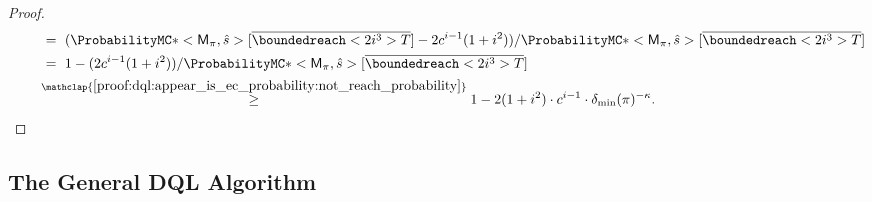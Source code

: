 \documentclass{theoretics}
\newcommand{\unionSym}{\cup}
\newcommand{\unionBin}{\mathbin{\unionSym}}
\newcommand{\union}{\unionBin}
\DeclareMathOperator*{\argmax}{arg\,max}
\newcommand{\MC}{\mathsf{M}}
\newcommand{\States}{S}
\newcommand{\initialstate}{\hat{s}}
\newcommand{\strategy}{\pi}
\DeclareMathOperator{\val}{\mathcal{V}}
\newcommand{\upperbound}{\mathsf{Up}}
\newcommand{\lowerbound}{\mathsf{Lo}}
\newcommand{\targetset}{T}
\newcommand{\successor}{\mathsf{succ}}
\newcommand{\algostep}{\mathsf{t}}
\newcommand{\algoepisode}{\mathsf{e}}
\newcommand{\umaxactions}{\mathsf{MaxA}}
\begin{document}
\begin{proof}
\begin{align*}
		& \qquad ~=~ (\ProbabilityMC*<\MC_\strategy, \initialstate>[\overline{\boundedreach<2 i^3> \targetset}] - 2 c^{i - 1} (1 + i^2)) / \ProbabilityMC*<\MC_\strategy, \initialstate>[\overline{\boundedreach<2 i^3> \targetset}] \\
		& \qquad ~=~ 1 - (2 c^{i - 1} (1 + i^2)) / \ProbabilityMC*<\MC_\strategy, \initialstate>[\overline{\boundedreach<2 i^3> \targetset}] \\
		& \qquad \overset{\mathclap{\ref{proof:dql:appear_is_ec_probability:not_reach_probability}}}{~\geq~} 1 - 2 (1 + i^2) \cdot c^{i - 1} \cdot \delta_{\min}(\strategy)^{-\kappa}. \qedhere 
	\end{align*}
\end{proof}
\subsection{The General DQL Algorithm}
\newcommand{\algolimit}{\mathsf{i}}
\newcommand{\algocollapsedstates}{\mathsf{collapsed}}
\newcommand{\algozerostates}{\mathsf{Z}}
\newcommand{\algorepresentative}{\mathsf{rep}}

\end{document}
